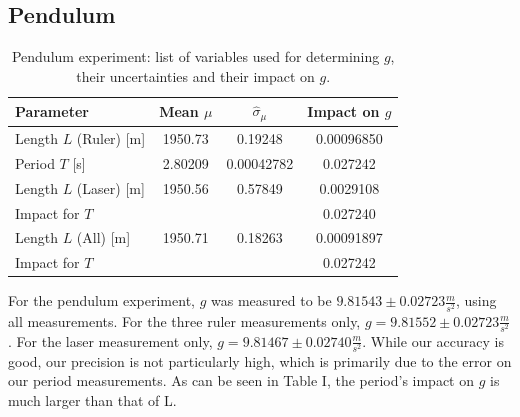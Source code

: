 \documentclass[a4paper,%
aps,%
prl,%
amsfonts,%
amssymb,%
amsmath,%
nobibnotes,%
twocolumn, %
twoside,%
balancelastpage,%
eqsecnum] %
{revtex4-1}
\begin{document}
\subsection{Pendulum}

\begin{table}[h]
  \caption{Pendulum experiment: list of variables used for determining $g$,
    their uncertainties and their impact on $g$.}
  \centering
  \begin{tabular}{lccc}
    Parameter & Mean $\mu$ &  $\hat{\sigma}_{\mu}$ &  Impact on $g$ \\\toprule
    Length $L$ (Ruler) [\si{\m}] & \num[round-precision=6,round-mode=figures]{1950.73} & \num[round-precision=5,round-mode=figures]{0.19248} & \num[round-precision=5,round-mode=figures]{0.00096850} \\
    Period $T$ [\si{\s}]  & \num[round-precision=6,round-mode=figures]{2.80209} & \num[round-precision=5,round-mode=figures]{0.00042782} & \num[round-precision=5,round-mode=figures]{0.027242} \\
    Length $L$ (Laser) [\si{\m}] & \num[round-precision=6,round-mode=figures]{1950.56} & \num[round-precision=5,round-mode=figures]{0.57849} & \num[round-precision=5,round-mode=figures]{0.0029108} \\
    Impact for $T$  & \num[round-precision=6,round-mode=figures]{} & \num[round-precision=5,round-mode=figures]{} & \num[round-precision=5,round-mode=figures]{0.027240} \\
    Length $L$ (All) [\si{\m}] & \num[round-precision=6,round-mode=figures]{1950.71} & \num[round-precision=5,round-mode=figures]{0.18263} & \num[round-precision=5,round-mode=figures]{0.00091897} \\
    Impact for $T$  & \num[round-precision=6,round-mode=figures]{} & \num[round-precision=5,round-mode=figures]{} & \num[round-precision=5,round-mode=figures]{0.027242} \\
  \end{tabular}
\end{table}

For the pendulum experiment, $g$ was measured to be $9.81543 \pm 0.02723
\frac{m}{s^2}$, using all measurements. For the three ruler measurements only,
$g = 9.81552 \pm 0.02723 \frac{m}{s^2}$. For the laser measurement only, $g =
9.81467 \pm 0.02740 \frac{m}{s^2}$. While our accuracy is good, our precision is
not particularly high, which is primarily due to the error on our period
measurements. As can be seen in Table I, the period's impact on $g$ is much
larger than that of L.
\end{document}
